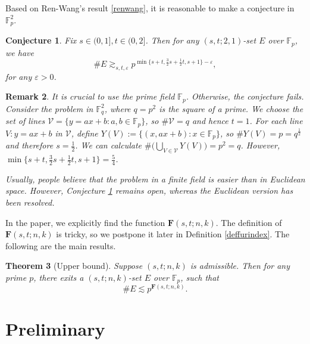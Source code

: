 \documentclass[10pt]{article}
\newtheorem{theorem}{Theorem}[section]
\newtheorem{remark}[theorem]{Remark}
\newtheorem{conjecture}[theorem]{Conjecture}
\newcommand{\cV}{\mathcal{V}}
\newcommand{\bF}{\mathbf{F}}
\newcommand{\F}{\mathbb F}
\newcommand{\e}{\varepsilon}
\newcommand{\Fp}{\mathbb{F}_p}
\begin{document}
\medskip

Based on Ren-Wang's result \eqref{renwang}, it is reasonable to make a conjecture in $\Fp^2$.

\begin{conjecture}\label{conj2d}
    Fix $s\in(0,1],t\in (0,2]$. Then for any $(s,t;2,1)$-set $E$ over $\Fp$, we have
    \[ \#E\gtrsim_{s,t,\e} p^{\min\{s+t,\frac{3}{2}s+\frac{1}{2}t,s+1  \}-\e}, \]
    for any $\e>0$.
\end{conjecture}

\begin{remark}
{\rm
    It is crucial to use the prime field $\Fp$. Otherwise, the conjecture fails. Consider the problem in $\F_q^2$, where $q=p^2$ is the square of a prime. We choose the set of lines $\cV=\{y=ax+b: a,b\in \Fp\}$, so $\#\cV=q$ and hence $t=1$. For each line $V: y=ax+b$ in $\cV$, define $Y(V):=\{(x,ax+b):x\in\Fp\}$, so $\#Y(V)=p=q^{\frac12}$ and therefore $s=\frac12$. We can calculate $\#\big(\bigcup_{V\in\cV}Y(V)\big)=p^2=q$. However, $\min\{s+t,\frac32s+\frac12t,s+1\}=\frac54$.

    Usually, people believe that the problem in a finite field is easier than in Euclidean space. However, Conjecture \ref{conj2d} remains open, whereas the Euclidean version has been resolved.
}
\end{remark}

\bigskip


In the paper, we explicitly find the function $\bF(s,t;n,k)$. The definition of $\bF(s,t;n,k)$ is tricky, so we postpone it later in Definition \ref{deffurindex}. The following are the main results.


\begin{theorem}[Upper bound]\label{upper bound}
    Suppose $(s,t;n,k)$ is admissible. Then for any prime $p$, there exits a $(s,t;n,k)$-set $E$ over $\Fp$, such that
    \[ \#E\lesssim p^{\bF(s,t;n,k)}. \] 
\end{theorem}
\setcounter{equation}{6}
\section{Preliminary}\label{sec2}
\end{document}
